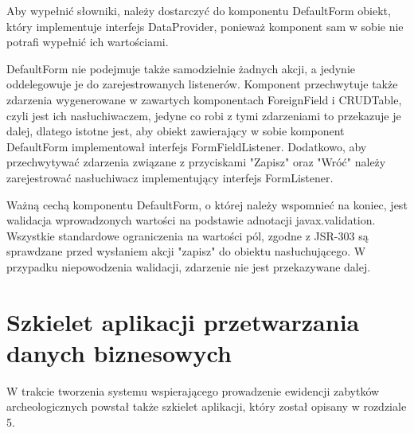 Aby wypełnić słowniki, należy dostarczyć do komponentu DefaultForm obiekt, który implementuje interfejs DataProvider, ponieważ komponent sam w sobie nie potrafi wypełnić ich wartościami.

\newpage
DefaultForm nie podejmuje także samodzielnie żadnych akcji, a jedynie oddelegowuje je do zarejestrowanych listenerów. Komponent przechwytuje także zdarzenia wygenerowane w zawartych komponentach ForeignField i CRUDTable, czyli jest ich nasłuchiwaczem, jedyne co robi z tymi zdarzeniami to przekazuje je dalej, dlatego istotne jest, aby obiekt zawierający w sobie komponent DefaultForm implementował interfejs FormFieldListener. Dodatkowo, aby przechwytywać zdarzenia związane z przyciskami "Zapisz" oraz "Wróć" należy zarejestrować nasłuchiwacz implementujący interfejs FormListener.

Ważną cechą komponentu DefaultForm, o której należy wspomnieć na koniec, jest walidacja wprowadzonych wartości na podstawie adnotacji javax.validation. Wszystkie standardowe ograniczenia na wartości pól, zgodne z JSR-303 są sprawdzane przed wysłaniem akcji "zapisz" do obiektu nasłuchującego. W przypadku niepowodzenia walidacji, zdarzenie nie jest przekazywane dalej.
\section{Szkielet aplikacji przetwarzania danych biznesowych}
W trakcie tworzenia systemu wspierającego prowadzenie ewidencji zabytków archeologicznych powstał także szkielet aplikacji, który został opisany w rozdziale 5.

